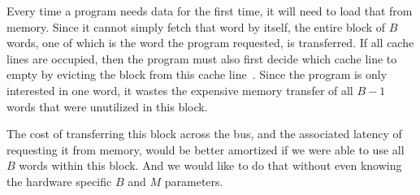\documentclass[11pt, letterpaper]{article}
\begin{document}
Every time a program needs data for the first time, it will need to load that from memory. Since it cannot simply fetch that word by itself, the entire block of $B$ words, one of which is the word the program requested, is transferred. If all cache lines are occupied, then the program must also first decide which cache line to empty by evicting the block from this cache line~\cite{demaine}. Since the program is only interested in one word, it wastes the expensive memory transfer of all $B-1$ words that were unutilized in this block.

The cost of transferring this block across the bus, and the associated latency of requesting it from memory, would be better amortized if we were able to use all $B$ words within this block. And we would like to do that without even knowing the hardware specific $B$ and $M$ parameters.
\end{document}
